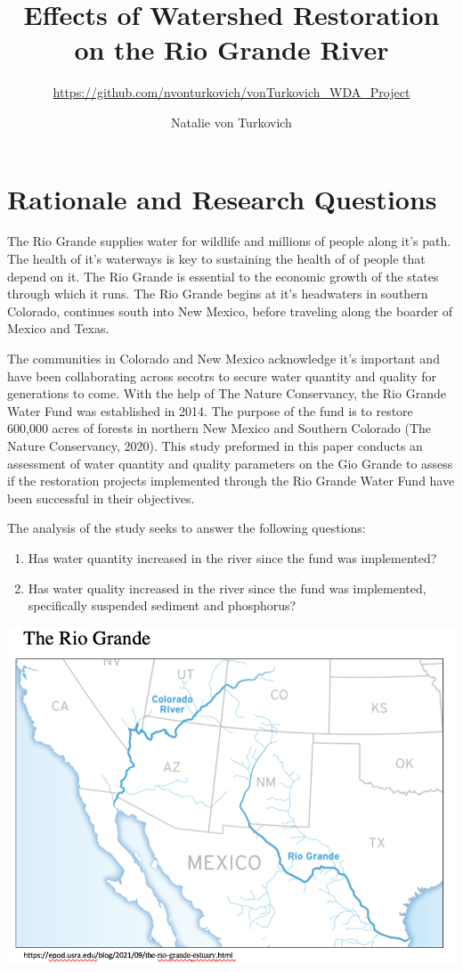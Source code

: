 \documentclass[
  12pt,
]{article}
\title{Effects of Watershed Restoration on the Rio Grande River}
\subtitle{\url{https://github.com/nvonturkovich/vonTurkovich_WDA_Project}}
\author{Natalie von Turkovich}
\date{}
\providecommand{\tightlist}{%
  \setlength{\itemsep}{0pt}\setlength{\parskip}{0pt}}
\begin{document}
\maketitle

\newpage

\hypertarget{rationale-and-research-questions}{%
\section{Rationale and Research
Questions}\label{rationale-and-research-questions}}

The Rio Grande supplies water for wildlife and millions of people along
it's path. The health of it's waterways is key to sustaining the health
of of people that depend on it. The Rio Grande is essential to the
economic growth of the states through which it runs. The Rio Grande
begins at it's headwaters in southern Colorado, continues south into New
Mexico, before traveling along the boarder of Mexico and Texas.

The communities in Colorado and New Mexico acknowledge it's important
and have been collaborating across secotrs to secure water quantity and
quality for generations to come. With the help of The Nature
Conservancy, the Rio Grande Water Fund was established in 2014. The
purpose of the fund is to restore 600,000 acres of forests in northern
New Mexico and Southern Colorado (The Nature Conservancy, 2020). This
study preformed in this paper conducts an assessment of water quantity
and quality parameters on the Gio Grande to assess if the restoration
projects implemented through the Rio Grande Water Fund have been
successful in their objectives.

The analysis of the study seeks to answer the following questions:

\begin{enumerate}
\def\labelenumi{\arabic{enumi}.}
\tightlist
\item
  Has water quantity increased in the river since the fund was
  implemented?
\item
  Has water quality increased in the river since the fund was
  implemented, specifically suspended sediment and phosphorus?
\end{enumerate}

\begin{center}\includegraphics[width=0.75\linewidth]{image1_riogrande} \end{center}
\end{document}
